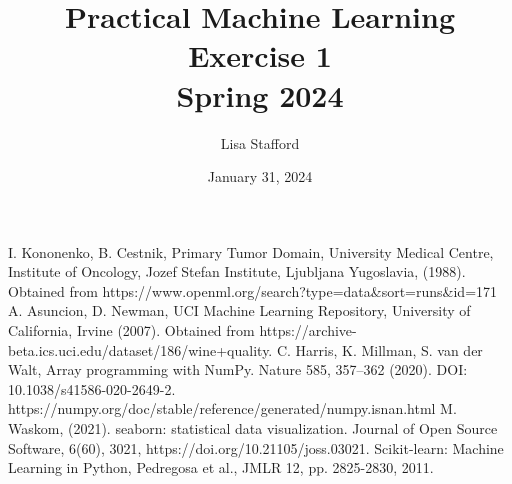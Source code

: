 \documentclass[titlepage]{article}
\title{%
	Practical Machine Learning\\
	
	\vspace*{2em}
	\LARGE Exercise 1 \\
	Spring 2024}
\author{Lisa Stafford}
\date{January 31, 2024}
\begin{document}
	
	\maketitle
	
	\captionsetup{
		format = plain,
		font = footnotesize,
		labelfont = sc
	}
	
	\begin{thebibliography}{9}
		 I. Kononenko, B. Cestnik,  Primary Tumor Domain, University Medical Centre, Institute of Oncology, Jozef Stefan Institute, Ljubljana Yugoslavia, (1988). Obtained from https://www.openml.org/search?type=data\&sort=runs\&id=171
		 A. Asuncion, D. Newman, UCI Machine Learning Repository, University of California, Irvine  (2007).  Obtained from https://archive-beta.ics.uci.edu/dataset/186/wine+quality. 
		 C. Harris, K. Millman, S. van der Walt,  Array programming with NumPy. Nature 585, 357–362 (2020). DOI: 10.1038/s41586-020-2649-2.  https://numpy.org/doc/stable/reference/generated/numpy.isnan.html
		 M. Waskom, (2021). seaborn: statistical data visualization. Journal of Open Source Software, 6(60), 3021, https://doi.org/10.21105/joss.03021.
		Scikit-learn: Machine Learning in Python, Pedregosa et al., JMLR 12, pp. 2825-2830, 2011. 
	\end{thebibliography}
	
\end{document}
